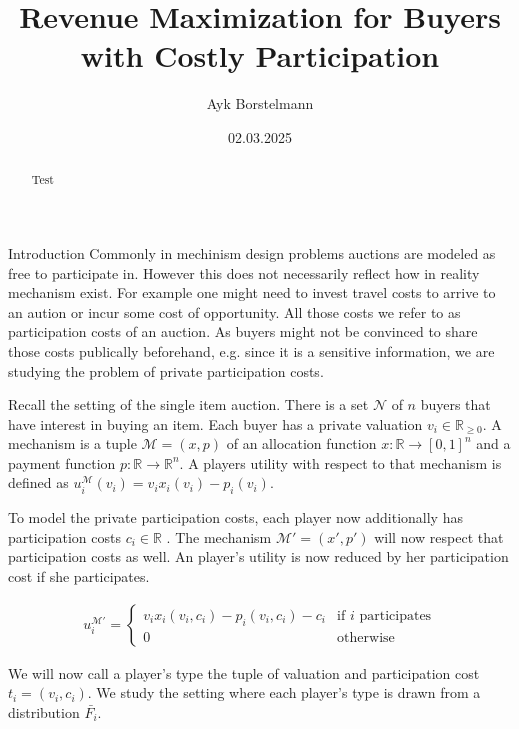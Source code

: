 \documentclass[11pt,a4paper]{article}
\author{Ayk Borstelmann}
\title{Revenue Maximization for Buyers with Costly Participation}
\date{02.03.2025}
\newcommand{\RR}{\ensuremath{\mathbb{R}}}
\newcommand{\1}[1]{\mbox{\rm\bf 1}_{#1}}
\begin{document}
\maketitle

\begin{abstract}
    Test
\end{abstract}

\begin{section}{Introduction}
 Commonly in mechinism design problems auctions are modeled as free to participate in.
 However this does not necessarily reflect how in reality mechanism exist.
 For example one might need to invest travel costs to arrive to an aution or incur some cost of opportunity.
 All those costs we refer to as participation costs of an auction.
 As buyers might not be convinced to share those costs publically beforehand, e.g. since it is a sensitive information, we are studying the problem of private participation costs.

 Recall the setting of the single item auction.
 There is a set $\mathcal{N}$ of $n$ buyers that have interest in buying an item.
 Each buyer has a private valuation $v_i \in \RR_{\geq 0}$.
 A mechanism is a tuple $\mathcal{M} = (x,p)$ of an allocation function $x: \RR \rightarrow [0,1]^n$ and a payment function $p: \RR \rightarrow \RR^n$.
 A players utility with respect to that mechanism is defined as $u_i^\mathcal{M}(v_i) = v_i x_i(v_i) - p_i(v_i)$.

 To model the private participation costs, each player now additionally has participation costs $c_i \in \RR$ \cite{primary}.
 The mechanism $\mathcal{M}' = (x', p')$ will now respect that participation costs as well.
 An player's utility is now reduced by her participation cost if she participates.

 \begin{align*}
     u_i^{\mathcal{M}'} = \begin{cases}
                              v_i x_i(v_i, c_i) - p_i(v_i, c_i) - c_i & \text{if $i$ participates} \\
                              0                                       & \text{otherwise}
                          \end{cases}
 \end{align*}

 We will now call a player's type the tuple of valuation and participation cost $t_i = (v_i, c_i)$.
 We study the setting where each player's type is drawn from a distribution $\bar{F_i}$.
\end{section}
\end{document}
